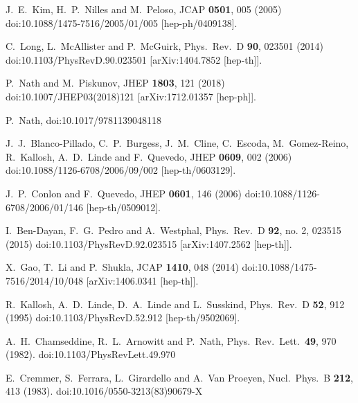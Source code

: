 \documentclass[12pt]{article}
\begin{document}
\begin{thebibliography}{99}
  J.~E.~Kim, H.~P.~Nilles and M.~Peloso,
  JCAP {\bf 0501}, 005 (2005)
  doi:10.1088/1475-7516/2005/01/005
  [hep-ph/0409138].

  C.~Long, L.~McAllister and P.~McGuirk,
  Phys.\ Rev.\ D {\bf 90}, 023501 (2014)
  doi:10.1103/PhysRevD.90.023501
  [arXiv:1404.7852 [hep-th]].

  P.~Nath and M.~Piskunov,
  JHEP {\bf 1803}, 121 (2018)
  doi:10.1007/JHEP03(2018)121
  [arXiv:1712.01357 [hep-ph]].

  P.~Nath,
  doi:10.1017/9781139048118

  J.~J.~Blanco-Pillado, C.~P.~Burgess, J.~M.~Cline, C.~Escoda, M.~Gomez-Reino, R.~Kallosh, A.~D.~Linde and F.~Quevedo,
  JHEP {\bf 0609}, 002 (2006)
  doi:10.1088/1126-6708/2006/09/002
  [hep-th/0603129].

  J.~P.~Conlon and F.~Quevedo,
  JHEP {\bf 0601}, 146 (2006)
  doi:10.1088/1126-6708/2006/01/146
  [hep-th/0509012].

  I.~Ben-Dayan, F.~G.~Pedro and A.~Westphal,
  Phys.\ Rev.\ D {\bf 92}, no. 2, 023515 (2015)
  doi:10.1103/PhysRevD.92.023515
  [arXiv:1407.2562 [hep-th]].

  X.~Gao, T.~Li and P.~Shukla,
  JCAP {\bf 1410}, 048 (2014)
  doi:10.1088/1475-7516/2014/10/048
  [arXiv:1406.0341 [hep-th]].

  R.~Kallosh, A.~D.~Linde, D.~A.~Linde and L.~Susskind,
  Phys.\ Rev.\ D {\bf 52}, 912 (1995)
  doi:10.1103/PhysRevD.52.912
  [hep-th/9502069].

  A.~H.~Chamseddine, R.~L.~Arnowitt and P.~Nath,
  Phys.\ Rev.\ Lett.\  {\bf 49}, 970 (1982).
  doi:10.1103/PhysRevLett.49.970

  E.~Cremmer, S.~Ferrara, L.~Girardello and A.~Van Proeyen,
  Nucl.\ Phys.\ B {\bf 212}, 413 (1983).
  doi:10.1016/0550-3213(83)90679-X


\end{thebibliography}
\end{document}
